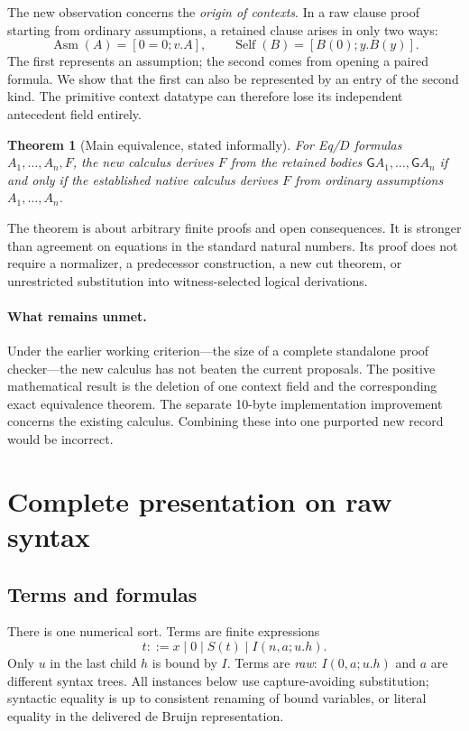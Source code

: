 \documentclass[11pt]{article}
\newtheorem{theorem}{Theorem}[section]
\theoremstyle{definition}
\theoremstyle{remark}
\newcommand{\gate}{\mathsf{G}}
\newcommand{\asm}{\operatorname{Asm}}
\newcommand{\self}{\operatorname{Self}}
\begin{document}
The new observation concerns the \emph{origin of contexts}. In a raw
clause proof starting from ordinary assumptions, a retained clause arises
in only two ways:
\[
 \asm(A)=[0=0;v.A],\qquad
 \self(B)=[B(0);y.B(y)].
\]
The first represents an assumption; the second comes from opening a
paired formula. We show that the first can also be represented by an
entry of the second kind. The primitive context datatype can therefore
lose its independent antecedent field entirely.

\begin{theorem}[Main equivalence, stated informally]
For Eq/$D$ formulas $A_1,\ldots,A_n,F$, the new calculus derives $F$ from
the retained bodies $\gate A_1,\ldots,\gate A_n$ if and only if the
established native calculus derives $F$ from ordinary assumptions
$A_1,\ldots,A_n$.
\end{theorem}

The theorem is about arbitrary finite proofs and open consequences. It is
stronger than agreement on equations in the standard natural numbers.
Its proof does not require a normalizer, a predecessor construction, a
new cut theorem, or unrestricted substitution into witness-selected
logical derivations.

\paragraph{What remains unmet.}
Under the earlier working criterion---the size of a complete standalone
proof checker---the new calculus has not beaten the current proposals.
The positive mathematical result is the deletion of one context field and
the corresponding exact equivalence theorem. The separate 10-byte
implementation improvement concerns the existing calculus. Combining
these into one purported new record would be incorrect.

\section{Complete presentation on raw syntax}
\label{sec:rules}

\subsection{Terms and formulas}

There is one numerical sort. Terms are finite expressions
\[
 t ::= x\mid 0\mid S(t)\mid I(n,a;u.h).
\]
Only $u$ in the last child $h$ is bound by $I$. Terms are \emph{raw}:
$I(0,a;u.h)$ and $a$ are different syntax trees. All instances below use
capture-avoiding substitution; syntactic equality is up to consistent
renaming of bound variables, or literal equality in the delivered
de Bruijn representation.
\end{document}
